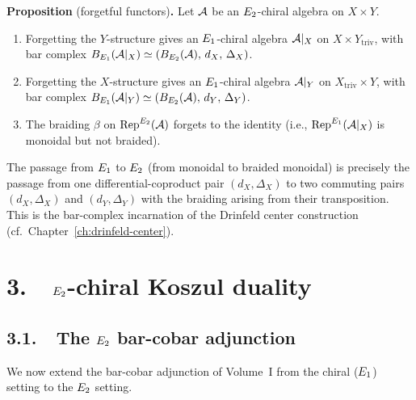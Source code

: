 \medskip
\noindent\textbf{Proposition} (forgetful functors)\textbf{.}\;
Let $\mathcal{A}$ be an $E_2$-chiral algebra on $X \times Y$.
\begin{enumerate}[label=(\roman*)]
 \item Forgetting the $Y$-structure gives an $E_1$-chiral algebra
 $\mathcal{A}|_X$ on $X \times Y_{\mathrm{triv}}$, with bar complex
 $B_{E_1}(\mathcal{A}|_X) \simeq (B_{E_2}(\mathcal{A}),\, d_X,\, \Delta_X)$.
 \item Forgetting the $X$-structure gives an $E_1$-chiral algebra
 $\mathcal{A}|_Y$ on $X_{\mathrm{triv}} \times Y$, with bar complex
 $B_{E_1}(\mathcal{A}|_Y) \simeq (B_{E_2}(\mathcal{A}),\, d_Y,\, \Delta_Y)$.
 \item The braiding $\beta$ on $\mathrm{Rep}^{E_2}(\mathcal{A})$ forgets to the
 identity (i.e., $\mathrm{Rep}^{E_1}(\mathcal{A}|_X)$ is monoidal but not braided).
\end{enumerate}

The passage from $E_1$ to $E_2$ (from monoidal to braided monoidal)
is precisely the passage from one differential-coproduct pair $(d_X,
\Delta_X)$ to two commuting pairs $(d_X, \Delta_X)$ and
$(d_Y, \Delta_Y)$ with the braiding arising from their transposition.
This is the bar-complex incarnation of the Drinfeld center construction
(cf.\ Chapter~\ref{ch:drinfeld-center}).



\section*{3.\ \ $E_2$-chiral Koszul duality}
\label{note:sec:e2-koszul}

\subsection*{3.1.\ \ The $E_2$ bar-cobar adjunction}

We now extend the bar-cobar adjunction of Volume~I from the chiral
($E_1$) setting to the $E_2$ setting.

